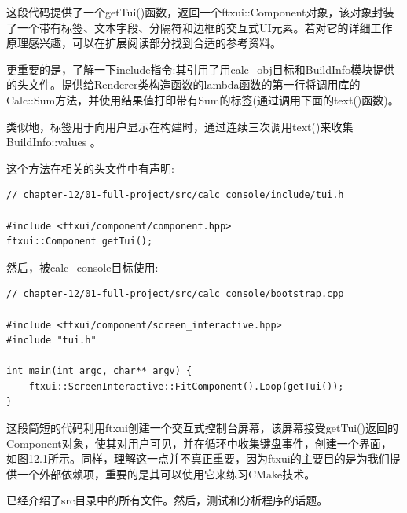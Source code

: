 这段代码提供了一个getTui()函数，返回一个ftxui::Component对象，该对象封装了一个带有标签、文本字段、分隔符和边框的交互式UI元素。若对它的详细工作原理感兴趣，可以在扩展阅读部分找到合适的参考资料。

更重要的是，了解一下include指令:其引用了用calc\_obj目标和BuildInfo模块提供的头文件。提供给Renderer类构造函数的lambda函数的第一行将调用库的Calc::Sum方法，并使用结果值打印带有Sum的标签(通过调用下面的text()函数)。

类似地，标签用于向用户显示在构建时，通过连续三次调用text()来收集BuildInfo::values 。

这个方法在相关的头文件中有声明:

\begin{lstlisting}[style=styleCXX]
// chapter-12/01-full-project/src/calc_console/include/tui.h

#include <ftxui/component/component.hpp>
ftxui::Component getTui();
\end{lstlisting}

然后，被calc\_console目标使用:

\begin{lstlisting}[style=styleCXX]
// chapter-12/01-full-project/src/calc_console/bootstrap.cpp

#include <ftxui/component/screen_interactive.hpp>
#include "tui.h"

int main(int argc, char** argv) {
	ftxui::ScreenInteractive::FitComponent().Loop(getTui());
}
\end{lstlisting}

这段简短的代码利用ftxui创建一个交互式控制台屏幕，该屏幕接受getTui()返回的Component对象，使其对用户可见，并在循环中收集键盘事件，创建一个界面，如图12.1所示。同样，理解这一点并不真正重要，因为ftxui的主要目的是为我们提供一个外部依赖项，重要的是其可以使用它来练习CMake技术。

已经介绍了src目录中的所有文件。然后，测试和分析程序的话题。





